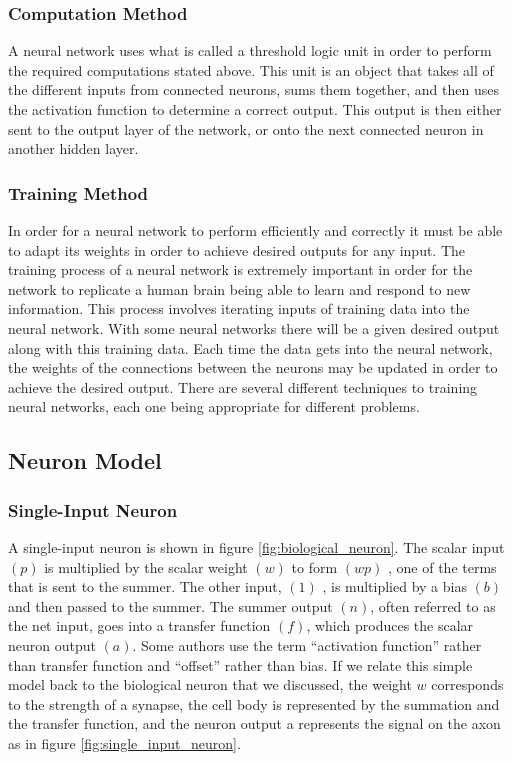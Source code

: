 \documentclass[12pt, a4paper, twoside]{report}
\begin{document}
\subsubsection{Computation Method}
A neural network uses what is called a threshold logic unit in order to perform the required computations stated above. This unit is an object that takes all of the different inputs from connected neurons, sums them together, and then uses the activation function to determine a correct output. This output is then either sent to the output layer of the network, or onto the next connected neuron in another hidden layer.

\subsubsection{Training Method}
In order for a neural network to perform efficiently and correctly it must be able to adapt its weights in order to achieve desired outputs for any input. The training process of a neural network is extremely important in order for the network to replicate a human brain being able to learn and respond to new information. This process involves iterating inputs of training data into the neural network. With some neural networks there will be a given desired output along with this training data. Each time the data gets into the neural network, the weights of the connections between the neurons may be updated in order to achieve the desired output. There are several different techniques to training neural networks, each one being appropriate for different problems.

\subsection{Neuron Model}
\subsubsection{Single-Input Neuron}
A single-input neuron is shown in figure \ref{fig:biological_neuron}. The scalar input $(p)$ is multiplied by the scalar weight $(w)$ to form $(wp)$ , one of the terms that is sent to the summer. The other input, $(1)$ , is multiplied by a bias $(b)$ and then passed to the summer. The summer output $(n)$, often referred to as the net input, goes into a transfer function $(f)$, which produces the scalar neuron output $(a)$. Some authors use the term ``activation function'' rather than transfer function and ``offset'' rather than bias. If we relate this simple model back to the biological neuron that we discussed, the weight $w$ corresponds to the strength of a synapse, the cell body is represented by the summation and the transfer function, and the neuron output a represents the signal on the axon as in figure \ref{fig:single_input_neuron}.
\end{document}
